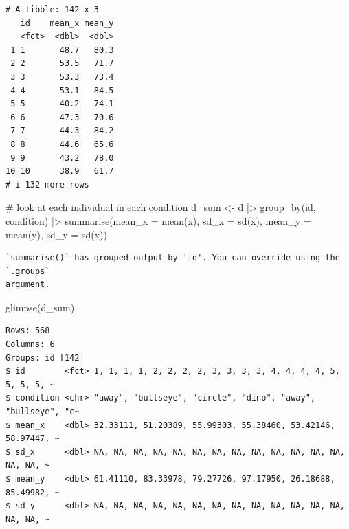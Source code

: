 \documentclass[
  letterpaper,
  DIV=11,
  numbers=noendperiod]{scrreprt}
\newenvironment{Shaded}{\begin{snugshade}}{\end{snugshade}}
\newcommand{\AttributeTok}[1]{\textcolor[rgb]{0.40,0.45,0.13}{#1}}
\newcommand{\CommentTok}[1]{\textcolor[rgb]{0.37,0.37,0.37}{#1}}
\newcommand{\FunctionTok}[1]{\textcolor[rgb]{0.28,0.35,0.67}{#1}}
\newcommand{\NormalTok}[1]{\textcolor[rgb]{0.00,0.23,0.31}{#1}}
\newcommand{\OtherTok}[1]{\textcolor[rgb]{0.00,0.23,0.31}{#1}}
\newcommand{\SpecialCharTok}[1]{\textcolor[rgb]{0.37,0.37,0.37}{#1}}
\begin{document}
\begin{verbatim}
# A tibble: 142 x 3
   id    mean_x mean_y
   <fct>  <dbl>  <dbl>
 1 1       48.7   80.3
 2 2       53.5   71.7
 3 3       53.3   73.4
 4 4       53.1   84.5
 5 5       40.2   74.1
 6 6       47.3   70.6
 7 7       44.3   84.2
 8 8       44.6   65.6
 9 9       43.2   78.0
10 10      38.9   61.7
# i 132 more rows
\end{verbatim}

\begin{Shaded}
\begin{Highlighting}[]
\CommentTok{\# look at each individual in each condition}
\NormalTok{d\_sum }\OtherTok{\textless{}{-}}\NormalTok{ d }\SpecialCharTok{|\textgreater{}} \FunctionTok{group\_by}\NormalTok{(id, condition) }\SpecialCharTok{|\textgreater{}}
    \FunctionTok{summarise}\NormalTok{(}\AttributeTok{mean\_x =} \FunctionTok{mean}\NormalTok{(x),}
              \AttributeTok{sd\_x =} \FunctionTok{sd}\NormalTok{(x),}
              \AttributeTok{mean\_y =} \FunctionTok{mean}\NormalTok{(y),}
              \AttributeTok{sd\_y =} \FunctionTok{sd}\NormalTok{(x))}
\end{Highlighting}
\end{Shaded}

\begin{verbatim}
`summarise()` has grouped output by 'id'. You can override using the `.groups`
argument.
\end{verbatim}

\begin{Shaded}
\begin{Highlighting}[]
\FunctionTok{glimpse}\NormalTok{(d\_sum)}
\end{Highlighting}
\end{Shaded}

\begin{verbatim}
Rows: 568
Columns: 6
Groups: id [142]
$ id        <fct> 1, 1, 1, 1, 2, 2, 2, 2, 3, 3, 3, 3, 4, 4, 4, 4, 5, 5, 5, 5, ~
$ condition <chr> "away", "bullseye", "circle", "dino", "away", "bullseye", "c~
$ mean_x    <dbl> 32.33111, 51.20389, 55.99303, 55.38460, 53.42146, 58.97447, ~
$ sd_x      <dbl> NA, NA, NA, NA, NA, NA, NA, NA, NA, NA, NA, NA, NA, NA, NA, ~
$ mean_y    <dbl> 61.41110, 83.33978, 79.27726, 97.17950, 26.18688, 85.49982, ~
$ sd_y      <dbl> NA, NA, NA, NA, NA, NA, NA, NA, NA, NA, NA, NA, NA, NA, NA, ~
\end{verbatim}
\end{document}
